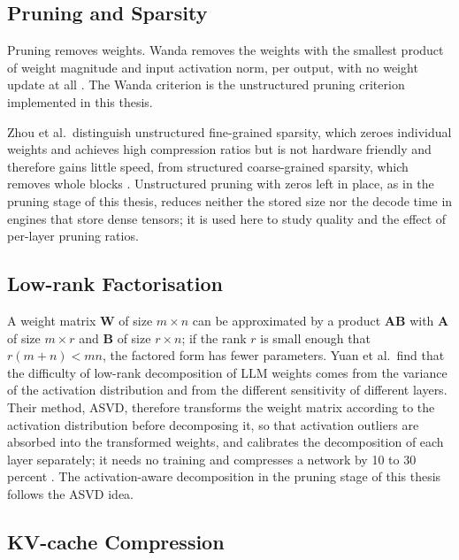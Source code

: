 \documentclass[
11pt, %
english, %
singlespacing, %
headsepline, %
]{MastersDoctoralThesis} %
\begin{document}
\subsection{Pruning and Sparsity}
\label{sec:ch2-pruning}

Pruning removes weights. Wanda removes the weights with the smallest product of weight magnitude and input activation norm, per output, with no weight update at all \cite{sun2024wanda}. The Wanda criterion is the unstructured pruning criterion implemented in this thesis.

Zhou et al.\ distinguish unstructured fine-grained sparsity, which zeroes individual weights and achieves high compression ratios but is not hardware friendly and therefore gains little speed, from structured coarse-grained sparsity, which removes whole blocks \cite{zhou2021nm}. Unstructured pruning with zeros left in place, as in the pruning stage of this thesis, reduces neither the stored size nor the decode time in engines that store dense tensors; it is used here to study quality and the effect of per-layer pruning ratios.

\subsection{Low-rank Factorisation}
\label{sec:ch2-lowrank}

A weight matrix $\mathbf{W}$ of size $m \times n$ can be approximated by a product $\mathbf{A}\mathbf{B}$ with $\mathbf{A}$ of size $m \times r$ and $\mathbf{B}$ of size $r \times n$; if the rank $r$ is small enough that $r(m + n) < mn$, the factored form has fewer parameters. Yuan et al.\ find that the difficulty of low-rank decomposition of LLM weights comes from the variance of the activation distribution and from the different sensitivity of different layers. Their method, ASVD, therefore transforms the weight matrix according to the activation distribution before decomposing it, so that activation outliers are absorbed into the transformed weights, and calibrates the decomposition of each layer separately; it needs no training and compresses a network by 10 to 30 percent \cite{yuan2025asvd}. The activation-aware decomposition in the pruning stage of this thesis follows the ASVD idea.

\subsection{KV-cache Compression}
\label{sec:ch2-kvcompress}
\end{document}
